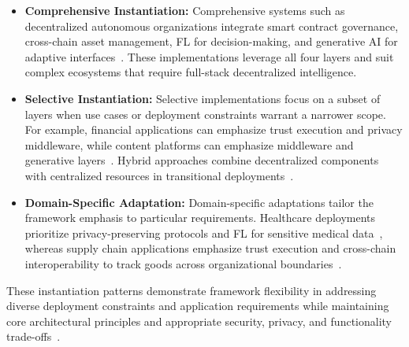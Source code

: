 \documentclass[5p,twocolumn]{elsarticle}
\begin{document}
\begin{itemize}

\item \textbf{Comprehensive Instantiation:} Comprehensive systems such as decentralized autonomous organizations integrate smart contract governance, cross-chain asset management, FL for decision-making, and generative AI for adaptive interfaces~\cite{li2024blockchain,shen2024artificial}. These implementations leverage all four layers and suit complex ecosystems that require full-stack decentralized intelligence.

\item \textbf{Selective Instantiation:} Selective implementations focus on a subset of layers when use cases or deployment constraints warrant a narrower scope. For example, financial applications can emphasize trust execution and privacy middleware, while content platforms can emphasize middleware and generative layers~\cite{duan2023metacube}. Hybrid approaches combine decentralized components with centralized resources in transitional deployments~\cite{tariq2025blockchain}.

\item \textbf{Domain-Specific Adaptation:} Domain-specific adaptations tailor the framework emphasis to particular requirements. Healthcare deployments prioritize privacy-preserving protocols and FL for sensitive medical data~\cite{thirunavukarasu2023large}, whereas supply chain applications emphasize trust execution and cross-chain interoperability to track goods across organizational boundaries~\cite{fasano2025exploring}. 

\end{itemize}

These instantiation patterns demonstrate framework flexibility in addressing diverse deployment constraints and application requirements while maintaining core architectural principles and appropriate security, privacy, and functionality trade-offs~\cite{huang2024large,khan2022transformers,vaswani2017attention}.
\end{document}
